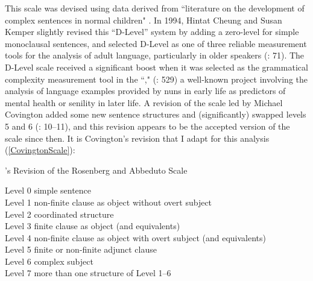 \documentclass[output=paper,colorlinks,citecolor=brown]{langscibook}
\begin{document}
\largerpage
This scale was devised using data derived from ``literature on the development of complex sentences in normal children" \citep[26]{ob:RosenbergAbbeduto1987}. In 1994, Hintat Cheung and Susan Kemper slightly revised this “D-Level” system by adding a zero-level for simple monoclausal sentences, and selected D-Level as one of three reliable measurement tools for the analysis of adult language, particularly in older speakers (\citealt{ob:CheungKemper1992}: 71). The D-Level scale received a significant boost when it was selected as the grammatical complexity measurement tool in the ``," (\citealt{ob:Snowdon1996}: 529) a well-known project involving the analysis of language examples provided by nuns in early life as predictors of mental health or senility in later life. A revision of the scale led by Michael Covington added some new sentence structures and (significantly) swapped levels 5 and 6  (\citealt{ob:CovingtonEtAL2006}: 10--11), and this revision appears to be the accepted version of the scale since then. It is Covington's revision that I adapt for this analysis (\ref{CovingtonScale}):

\ea\label{CovingtonScale}
\citet{ob:CovingtonEtAL2006}'s Revision of the Rosenberg and Abbeduto Scale 

Level 0  simple sentence\\
Level 1  non-finite clause as object without overt subject\\
Level 2  coordinated structure\\
Level 3  finite clause as object (and equivalents)\\
Level 4  non-finite clause as object with overt subject (and equivalents)\\
Level 5  finite or non-finite adjunct clause\\
Level 6  complex subject\\
Level 7  more than one structure of Level 1--6
\z

\end{document}

